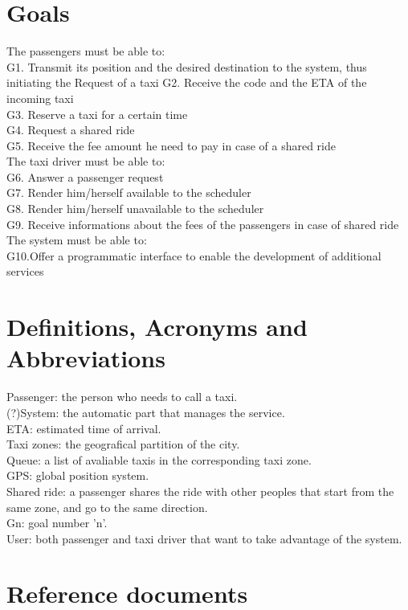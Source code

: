 \documentclass[a4paper,11pt]{report}
\begin{document}
\section{Goals}
The passengers must be able to:\\
 G1. Transmit its position and the desired destination to the system, thus initiating the Request of a taxi
    G2. Receive the code and the ETA of the incoming taxi\\
    G3. Reserve a taxi for a certain time\\
    G4. Request a shared ride\\
    G5. Receive the fee amount he need to pay in case of a shared ride\\
The taxi driver must be able to:\\
    G6. Answer a passenger request\\
    G7. Render him/herself available to the scheduler\\
    G8. Render him/herself unavailable to the scheduler\\
    G9. Receive informations about the fees of the passengers in case of shared ride\\
The system must be able to:\\
   G10.Offer a programmatic interface to enable the development of additional services\\
 
\section{Definitions, Acronyms and Abbreviations}
Passenger: the person who needs to call a taxi.\\
(?)System: the automatic part that manages the service.\\
ETA: estimated time of arrival.\\
Taxi zones: the geografical partition of the city.\\
Queue: a list of avaliable taxis in the corresponding taxi zone.\\
GPS: global position system.\\
Shared ride: a passenger shares the ride with other peoples that start from the same zone, and go to the same direction.\\
Gn: goal number 'n'.\\
User: both passenger and taxi driver that want to take advantage of the system.
 
\section{Reference documents}
\end{document}
